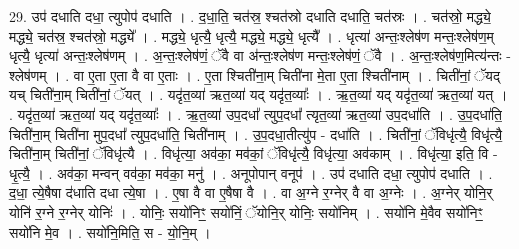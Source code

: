 \documentclass[17pt]{extarticle}
\begin{document}
29. उप॑ दधाति दधा॒ त्युपोप॑ दधाति । . द॒धा॒ति॒ चत॑स्र॒ श्चत॑स्रो दधाति दधाति॒ चत॑स्रः । . चत॑स्रो॒ मद्ध्ये॒ मद्ध्ये॒ चत॑स्र॒ श्चत॑स्रो॒ मद्ध्ये᳚ । . मद्ध्ये॒ धृत्यै॒ धृत्यै॒ मद्ध्ये॒ मद्ध्ये॒ धृत्यै᳚ । . धृत्या॑ अन्तः॒श्लेष॑ण मन्तः॒श्लेष॑ण॒म् धृत्यै॒ धृत्या॑ अन्तः॒श्लेष॑णम् । . अ॒न्तः॒श्लेष॑णं॒ ॅवै वा अ॑न्तः॒श्लेष॑ण मन्तः॒श्लेष॑णं॒ ॅवै । . अ॒न्तः॒श्लेष॑ण॒मित्य॑न्तः - श्लेष॑णम् । . वा ए॒ता ए॒ता वै वा ए॒ताः । . ए॒ता श्चिती॑ना॒म् चिती॑ना मे॒ता ए॒ता श्चिती॑नाम् । . चिती॑नां॒ ॅयद् यच् चिती॑ना॒म् चिती॑नां॒ ॅयत् । . यदृ॑त॒व्या॑ ऋत॒व्या॑ यद् यदृ॑त॒व्याः᳚ । . ऋ॒त॒व्या॑ यद् यदृ॑त॒व्या॑ ऋत॒व्या॑ यत् । . यदृ॑त॒व्या॑ ऋत॒व्या॑ यद् यदृ॑त॒व्याः᳚ । . ऋ॒त॒व्या॑ उप॒दधा᳚ त्युप॒दधा᳚ त्यृत॒व्या॑ ऋत॒व्या॑ उप॒दधा॑ति । . उ॒प॒दधा॑ति॒ चिती॑ना॒म् चिती॑ना मुप॒दधा᳚ त्युप॒दधा॑ति॒ चिती॑नाम् । . उ॒प॒दधा॒तीत्यु॑प - दधा॑ति । . चिती॑नां॒ ॅविधृ॑त्यै॒ विधृ॑त्यै॒ चिती॑ना॒म् चिती॑नां॒ ॅविधृ॑त्यै । . विधृ॑त्या॒ अव॑का॒ मव॑कां॒ ॅविधृ॑त्यै॒ विधृ॑त्या॒ अव॑काम् । . विधृ॑त्या॒ इति॒ वि - धृ॒त्यै॒ । . अव॑का॒ मन्वन् वव॑का॒ मव॑का॒ मनु॑ । . अनूपोपान् वनूप॑ । . उप॑ दधाति दधा॒ त्युपोप॑ दधाति । . द॒धा॒ त्ये॒षैषा द॑धाति दधा त्ये॒षा । . ए॒षा वै वा ए॒षैषा वै । . वा अ॒ग्ने र॒ग्नेर् वै वा अ॒ग्नेः । . अ॒ग्नेर् योनि॒र् योनि॑ र॒ग्ने र॒ग्नेर् योनिः॑ । . योनिः॒ सयो॑निꣳ॒॒ सयो॑निं॒ ॅयोनि॒र् योनिः॒ सयो॑निम् । . सयो॑नि मे॒वैव सयो॑निꣳ॒॒ सयो॑नि मे॒व । . सयो॑नि॒मिति॒ स - यो॒नि॒म् । \newline
\end{document}
